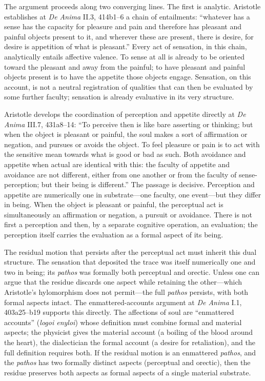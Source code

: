 \documentclass[12pt]{article}
\begin{document}
The argument proceeds along two converging lines. The first is analytic. Aristotle establishes at \textit{De Anima} II.3, 414b1--6 a chain of entailments: ``whatever has a sense has the capacity for pleasure and pain and therefore has pleasant and painful objects present to it, and wherever these are present, there is desire, for desire is appetition of what is pleasant.'' Every act of sensation, in this chain, analytically entails affective valence. To sense at all is already to be oriented toward the pleasant and away from the painful; to have pleasant and painful objects present is to have the appetite those objects engage. Sensation, on this account, is not a neutral registration of qualities that can then be evaluated by some further faculty; sensation is already evaluative in its very structure.

Aristotle develops the coordination of perception and appetite directly at \textit{De Anima} III.7, 431a8--14: ``To perceive then is like bare asserting or thinking; but when the object is pleasant or painful, the soul makes a sort of affirmation or negation, and pursues or avoids the object. To feel pleasure or pain is to act with the sensitive mean towards what is good or bad as such. Both avoidance and appetite when actual are identical with this: the faculty of appetite and avoidance are not different, either from one another or from the faculty of sense-perception; but their being is different.'' The passage is decisive. Perception and appetite are numerically one in substrate---one faculty, one event---but they differ in being. When the object is pleasant or painful, the perceptual act is simultaneously an affirmation or negation, a pursuit or avoidance. There is not first a perception and then, by a separate cognitive operation, an evaluation; the perception itself carries the evaluation as a formal aspect of its being.

The residual motion that persists after the perceptual act must inherit this dual structure. The sensation that deposited the trace was itself numerically one and two in being; its \textit{pathos} was formally both perceptual and orectic. Unless one can argue that the residue discards one aspect while retaining the other---which Aristotle's hylomorphism does not permit---the full \textit{pathos} persists, with both formal aspects intact. The enmattered-accounts argument at \textit{De Anima} I.1, 403a25--b19 supports this directly. The affections of soul are ``enmattered accounts'' (\textit{logoi enyloi}) whose definition must combine formal and material aspects; the physicist gives the material account (a boiling of the blood around the heart), the dialectician the formal account (a desire for retaliation), and the full definition requires both. If the residual motion is an enmattered \textit{pathos}, and the \textit{pathos} has two formally distinct aspects (perceptual and orectic), then the residue preserves both aspects as formal aspects of a single material substrate.
\end{document}
